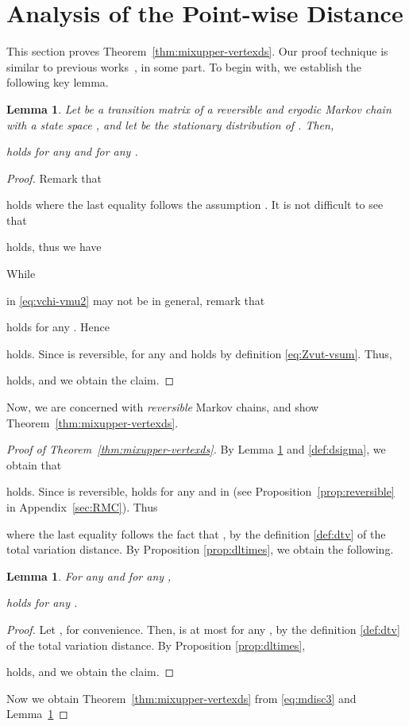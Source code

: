 \documentclass[letter, 11pt]{article}
\newcommand{\1}{\mbox{1}\hspace{-0.25em}\mbox{l}}
\newtheorem{lemma}[theorem]{Lemma}
\begin{document}
\section{Analysis of the Point-wise Distance}\label{sec:main}
This section proves Theorem~\ref{thm:mixupper-vertexds}. 
 Our proof technique is similar to previous works~\cite{CS06, KKM12, RSW98}, in some part. 
To begin with, we establish the following key lemma. 
\begin{lemma}
\label{lemm:maindisc}
 Let  be a transition matrix of 
  a reversible and ergodic Markov chain with a state space , 
  and let  be the stationary distribution of . 
Then, 

holds for any  and for any .
\end{lemma}
\begin{proof}
Remark that

 holds where the last equality follows the assumption . 
It is not difficult to see that 

holds, thus we have

 While 
   
   in \eqref{eq:vchi-vmu2} 
   may not be  in general, 
  remark that 

 holds for any . 
Hence

 holds. 
Since  is reversible,  for any  and 
 holds by definition \eqref{eq:Zvut-vsum}. 
Thus, 

holds, and we obtain the claim.
\end{proof}
Now, we are concerned with {\em reversible} Markov chains, 
and show Theorem~\ref{thm:mixupper-vertexds}. 
\begin{proof}[Proof of Theorem~\ref{thm:mixupper-vertexds}]
By Lemma \ref{lemm:maindisc} and \eqref{def:dsigma}, we obtain that

  holds. 
 Since  is reversible, 
   holds for any  and  in  
 (see Proposition~\ref{prop:reversible} in Appendix~\ref{sec:RMC}). 
 Thus

  where the last equality follows 
  the fact that 
   , 
   by the definition \eqref{def:dtv} of the total variation distance. 
By Proposition \ref{prop:dltimes}, we obtain the following. 
\begin{lemma}
\label{lemm:dtsum}
For any  and for any , 

holds for any  . 
\end{lemma} 

\begin{proof}Let , for convenience. 
 Then,  is at most  for any , by the definition \eqref{def:dtv} of the total variation distance. 
 By Proposition \ref{prop:dltimes}, 

holds, and we obtain the claim.
\end{proof}

Now we obtain Theorem~\ref{thm:mixupper-vertexds} 
from \eqref{eq:mdisc3} and Lemma~\ref{lemm:dtsum}
\end{proof}
\end{document}
